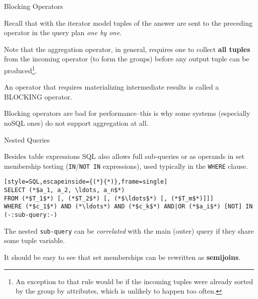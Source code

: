 %
%
\begin{frame}{Blocking Operators}
\label{blocking_operator}

Recall that with the iterator model tuples of the answer are sent to the preceding operator in the query plan \emph{one by one}.

Note that the aggregation operator, in general, requires one to collect \textbf{all tuples} from the incoming operator (to form the groups) \alert{before} any output tuple can be produced\footnote{An exception to that rule would be if the incoming tuples were already sorted by the group by attributes, which is unlikely to happen too often.}.

An operator that requires materializing intermediate results is called a \alert{BLOCKING operator}.

Blocking operators are bad for performance--this is why some systems (especially noSQL ones) do not support aggregation at all.

\end{frame}


%
%
\begin{frame}[fragile]{Nested Queries}

Besides table expressions SQL also allows full sub-queries or as operands in set membership testing (\lstinline[style=SQL]{IN}/\lstinline[style=SQL]{NOT IN} expressions), used typically in the \lstinline[style=SQL]{WHERE} clause. 

\begin{center}
\begin{minipage}{0.8\textwidth}
\begin{lstlisting}[style=SQL,escapeinside={(*}{*)},frame=single]
SELECT (*$a_1, a_2, \ldots, a_n$*)
FROM (*$T_1$*) [, (*$T_2$*) [, (*$\ldots$*) [, (*$T_m$*)]]]
WHERE (*$c_1$*) AND (*\ldots*) AND (*$c_k$*) AND|OR (*$a_i$*) [NOT] IN (-:sub-query:-)
\end{lstlisting}
\end{minipage}
\end{center}

The nested \lstinline[style=SQL]{sub-query} can be \emph{correlated} with the main (outer) query if they share some tuple variable.

It should be easy to see that set memberships can be rewritten as \alert{\textbf{semijoins}}.

\end{frame}

